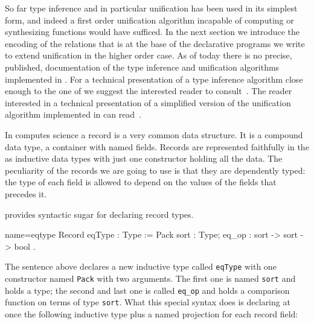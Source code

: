 So far type inference and in particular unification has been used in
its simplest form, and indeed a first order unification algorithm
incapable of computing or synthesizing functions would have sufficed.
In the next section we introduce the encoding of the relations that
is at the base of the declarative programs we write to
extend unification in the higher order case.
As of today there is no precise, published, documentation of the type
inference and unification algorithms implemented in \Coq{}.  For a
technical presentation of a type inference algorithm close enough to
the one of \Coq{} we suggest the interested reader to
consult~\cite{DBLP:journals/corr/abs-1202-4905}.  The reader
interested in a technical presentation of a simplified version of the
unification algorithm implemented in \Coq{} can
read~\cite{unifcoq,betaderekjournal}.

\mcbREQUIRE{}
\mcbNOTES{}
\label{sec:eqtype}

In computes science a record is a very common data structure.  It is a
compound data type, a container with named fields.  Records are
represented faithfully in the \mcbCIC{} as
inductive data types with just one constructor holding all the data.
The peculiarity of the records we are going to use is that they are
dependently typed: the type of each field is allowed to depend on
the values of the fields that precedes it.

\Coq{} provides syntactic sugar for declaring record types.

\begin{coq}{name=eqtype}{}
Record eqType : Type := Pack {
  sort : Type;
  eq_op : sort -> sort -> bool
}.
\end{coq}\label{eqtype:noproof}

The sentence above declares a new inductive type called
\lstinline/eqType/ with one constructor named
\lstinline/Pack/ with two arguments.  The first one
is named \lstinline/sort/ and holds a type; the second and last
one is called \lstinline/eq_op/ and holds a comparison function
on terms of type \lstinline/sort/.  What this special syntax
does is declaring at once the following inductive type plus
a named projection for each record field:

